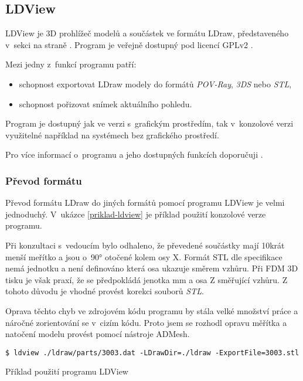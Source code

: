 \subsection{LDView}
LDView je 3D prohlížeč modelů a součástek ve formátu LDraw, představeného v~sekci  na straně \pageref{ldraw-format}. Program je veřejně dostupný pod licencí \gls{GPLv2} \autocite{GPLv2}.

Mezi jedny z~funkcí programu patří: 
\begin{itemize}
    \item schopnost exportovat LDraw modely do formátů \textit{POV-Ray}, \textit{3DS} nebo \textit{STL},
    \item schopnost pořizovat snímek aktuálního pohledu.
\end{itemize}

Program je dostupný jak ve verzi s~grafickým prostředím, tak v~konzolové verzi využitelné například na systémech bez grafického prostředí.

Pro více informací o~programu a jeho dostupných funkcích doporučuji \autocite{ldview}.

\subsubsection*{Převod formátu}

Převod formátu LDraw do jiných formátů pomocí programu LDView je velmi jednoduchý. V~ukázce \ref{priklad-ldview} je příklad použití konzolové verze programu. 

Při konzultaci s~vedoucím bylo odhaleno, že převedené součástky mají 10krát menší meřítko a jsou o~90° otočené kolem osy X. Formát \gls{STL} dle specifikace \autocite{stl:specification} nemá jednotku a není definováno která osa ukazuje směrem vzhůru. Při \gls{FDM} 3D tisku je však praxí, že se předpokládá jenotka mm a osa Z směřující vzhůru. Z tohoto důvodu je vhodné provést korekci souborů \textit{STL}.

Oprava těchto chyb ve zdrojovém kódu programu by stála velké množství práce a náročné zorientování se v~cizím kódu. Proto jsem se rozhodl opravu měřítka a natočení modelu provést pomocí nástroje ADMesh. 

 \begin{listing}[htbp]
        \begin{verbatim}
$ ldview ./ldraw/parts/3003.dat -LDrawDir=./ldraw -ExportFile=3003.stl 
        \end{verbatim}
    \caption{Příklad použití programu LDView \label{priklad-ldview}}
\end{listing}



